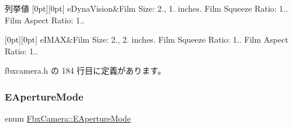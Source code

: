 \begin{DoxyEnumFields}{列挙値}
[0pt][0pt]{}\mbox{\label{class_fbx_camera_ac26ac89602453c5917882c69d4863d13a8d6bf970107658d8461f6cefc92f0f10}} 
e\+Dyna\+Vision&Film Size\+: 2., 1. inches. Film Squeeze Ratio\+: 1.. Film Aspect Ratio\+: 1.. \\
\hline

[0pt][0pt]{}\mbox{\label{class_fbx_camera_ac26ac89602453c5917882c69d4863d13abd885226c5e2eb363058e8e15b2172db}} 
e\+I\+M\+AX&Film Size\+: 2., 2. inches. Film Squeeze Ratio\+: 1.. Film Aspect Ratio\+: 1.. \\
\hline

\end{DoxyEnumFields}


 fbxcamera.\+h の 184 行目に定義があります。

\mbox{\label{class_fbx_camera_addeea6fc943ce5f087dbc54c142f890e}} 
\subsubsection{\texorpdfstring{E\+Aperture\+Mode}{EApertureMode}}
{\footnotesize\ttfamily enum \hyperlink{class_fbx_camera_addeea6fc943ce5f087dbc54c142f890e}{Fbx\+Camera\+::\+E\+Aperture\+Mode}}

